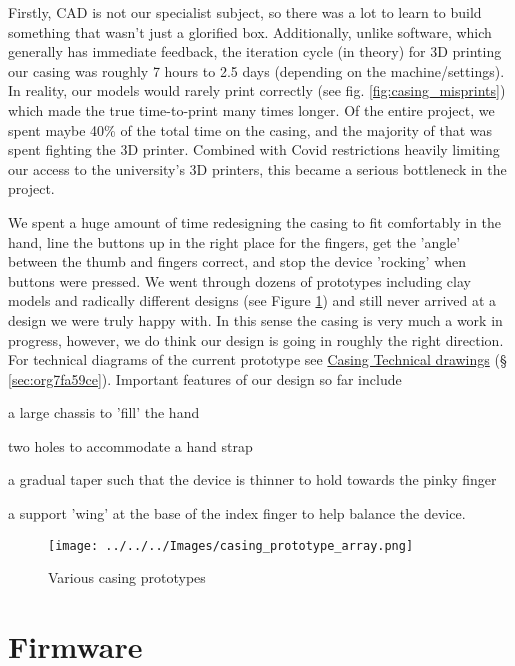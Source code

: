 \documentclass[logo,bsc,singlespacing,parskip]{infthesis}
\begin{document}
Firstly, CAD is not our specialist subject, so there was a lot to learn to build something that wasn't just a glorified box.
Additionally, unlike software, which generally has immediate feedback, the iteration cycle (in theory) for 3D printing our casing was roughly 7 hours to 2.5 days (depending on the machine/settings).
In reality, our models would rarely print correctly (see fig. \ref{fig:casing_misprints}) which made the true time-to-print many times longer.
Of the entire project, we spent maybe 40\% of the total time on the casing, and the majority of that was spent fighting the 3D printer.
Combined with Covid restrictions heavily limiting our access to the university's 3D printers, this became a serious bottleneck in the project.

We spent a huge amount of time redesigning the casing to fit comfortably in the hand, line the buttons up in the right place for the fingers, get the 'angle' between the thumb and fingers correct, and stop the device 'rocking' when buttons were pressed.
We went through dozens of prototypes including clay models and radically different designs (see Figure \ref{fig:casing_prototypes}) and still never arrived at a design we were truly happy with.
In this sense the casing is very much a work in progress, however, we do think our design is going in roughly the right direction.
For technical diagrams of the current prototype see
\hyperref[sec:org7fa59ce]{Casing Technical drawings} (§ \ref{sec:org7fa59ce}).
Important features of our design so far include
\begin{enumerate*}[label={\arabic*)}, itemjoin={, \,}, itemjoin*={, and \,}]
\item a large chassis to 'fill' the hand
\item two holes to accommodate a hand strap
\item a gradual taper such that the device is thinner to hold towards the pinky finger
\item a support 'wing' at the base of the index finger to help balance the device.
\end{enumerate*}

\begin{figure}[h]
\centering
\texttt{[image: ../../../Images/casing\_prototype\_array.png]}
\caption{\label{fig:casing_prototypes}Various casing prototypes}
\end{figure}
\section{Firmware}
\label{sec:org058e68b}
\end{document}
